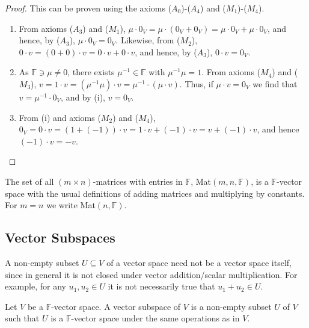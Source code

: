 		\begin{proof} This can be proven using the axioms ($A_0$)-($A_4$) and ($M_1$)-($M_4$).
			
			\begin{enumerate}[label=\roman*.]
				\item From axioms ($A_3$) and ($M_1$), $\mu \cdot 0_V = \mu \cdot (0_V + 0_V) = \mu \cdot 0_V + \mu \cdot 0_V$, and hence, by ($A_3$), $\mu \cdot 0_V = 0_V$. Likewise, from ($M_2$), $0 \cdot v = (0 + 0) \cdot v = 0 \cdot v + 0 \cdot v$, and hence, by ($A_3$), $0 \cdot v = 0_V$.
				\item As $\mathbb{F} \ni \mu \neq 0$, there exists $\mu^{-1} \in \mathbb{F}$ with $\mu^{-1}\mu = 1$. From axioms ($M_4$) and ($M_3$), $v = 1 \cdot v = (\mu^{-1}\mu) \cdot v = \mu^{-1} \cdot (\mu \cdot v)$. Thus, if $\mu \cdot v = 0_V$ we find that $v = \mu^{-1} \cdot 0_V$, and by (i), $v = 0_V$.
				\item From (i) and axioms ($M_2$) and ($M_4$), $0_V = 0 \cdot v = (1 + (-1)) \cdot v = 1 \cdot v + (-1) \cdot v = v + (-1) \cdot v$, and hence $(-1) \cdot v = -v$.
			\end{enumerate}
			
		\end{proof}
		
		\begin{example}[Matrices]
			The set of all $\left(m \times n\right)$-matrices with entries in $\mathbb{F}$, Mat$(m,n,\mathbb{F})$, is a $\mathbb{F}$-vector space with the usual definitions of adding matrices and multiplying by constants. For $m = n$ we write Mat$(n, \mathbb{F})$.
		\end{example}
		
	\subsection{Vector Subspaces}
		
		\indent \indent A non-empty subset $U \subseteq V$ of a vector space need not be a vector space itself, since in general it is not closed under vector addition/scalar multiplication. For example, for any $u_1, u_2 \in U$ it is not necessarily true that $u_1 + u_2 \in U$.
		
		\begin{definition}
			Let $V$ be a $\mathbb{F}$-vector space. A vector subspace of $V$ is a non-empty subset $U$ of $V$ such that $U$ is a $\mathbb{F}$-vector space under the same operations as in $V$.
		\end{definition}
		
